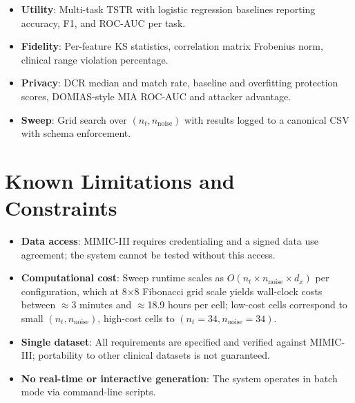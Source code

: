 \begin{itemize}\tightlist
    \item \textbf{Utility}: Multi-task TSTR with logistic regression baselines reporting accuracy, F1, and ROC-AUC per task.
    \item \textbf{Fidelity}: Per-feature KS statistics, correlation matrix Frobenius norm, clinical range violation percentage.
    \item \textbf{Privacy}: DCR median and match rate, baseline and overfitting protection scores, DOMIAS-style MIA ROC-AUC and attacker advantage.
    \item \textbf{Sweep}: Grid search over $(n_t, n_{\text{noise}})$ with results logged to a canonical CSV with schema enforcement.
\end{itemize}

\section{Known Limitations and Constraints}

\begin{itemize}\tightlist
    \item \textbf{Data access}: MIMIC-III requires credentialing and a signed data use agreement; the system cannot be tested without this access.
    \item \textbf{Computational cost}: Sweep runtime scales as $O(n_t \times n_{\text{noise}} \times d_x)$ per configuration, which at 8$\times$8 Fibonacci grid scale yields wall-clock costs between $\approx$3 minutes and $\approx$18.9 hours per cell; low-cost cells correspond to small $(n_t, n_{\text{noise}})$, high-cost cells to $(n_t{=}34, n_{\text{noise}}{=}34)$.
    \item \textbf{Single dataset}: All requirements are specified and verified against MIMIC-III; portability to other clinical datasets is not guaranteed.
    \item \textbf{No real-time or interactive generation}: The system operates in batch mode via command-line scripts.
\end{itemize}
